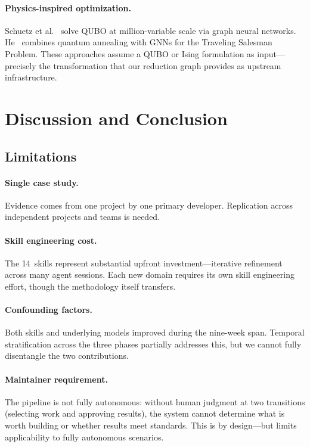 \documentclass[conference]{IEEEtran}
\begin{document}
\paragraph{Physics-inspired optimization.}
Schuetz et al.~\cite{Schuetz2022PhysicsGNN} solve QUBO at million-variable scale via graph neural networks.
He~\cite{He2024QuantumTSP} combines quantum annealing with GNNs for the Traveling Salesman Problem.
These approaches assume a QUBO or Ising formulation as input---precisely the transformation that our reduction graph provides as upstream infrastructure.

\section{Discussion and Conclusion}\label{sec:conclusion}

\subsection{Limitations}

\paragraph{Single case study.}
Evidence comes from one project by one primary developer.
Replication across independent projects and teams is needed.

\paragraph{Skill engineering cost.}
The 14~skills represent substantial upfront investment---iterative refinement across many agent sessions.
Each new domain requires its own skill engineering effort, though the methodology itself transfers.

\paragraph{Confounding factors.}
Both skills and underlying models improved during the nine-week span.
Temporal stratification across the three phases partially addresses this, but we cannot fully disentangle the two contributions.

\paragraph{Maintainer requirement.}
The pipeline is not fully autonomous: without human judgment at two transitions (selecting work and approving results), the system cannot determine what is worth building or whether results meet standards.
This is by design---but limits applicability to fully autonomous scenarios.
\end{document}
